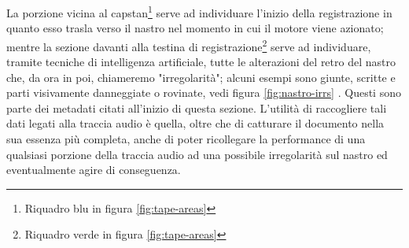 La porzione vicina al capstan\footnote{Riquadro blu in figura \ref{fig:tape-areas}} serve ad individuare l'inizio della registrazione in quanto esso trasla verso il nastro nel momento in cui il motore viene azionato; mentre la sezione davanti alla testina di registrazione\footnote{Riquadro verde in figura \ref{fig:tape-areas}} serve ad individuare, tramite tecniche di intelligenza artificiale, tutte le alterazioni del retro del nastro che, da ora in poi, chiameremo "irregolarità"; alcuni esempi sono giunte, scritte e parti visivamente danneggiate o rovinate, vedi figura \ref{fig:nastro-irrs} \cite{gravaTesiVideoAnalyser2019}.
Questi sono parte dei metadati citati all'inizio di questa sezione.
L'utilità di raccogliere tali dati legati alla traccia audio è quella, oltre che di catturare il documento nella sua essenza più completa, anche di poter ricollegare la performance di una qualsiasi porzione della traccia audio ad una possibile irregolarità sul nastro ed eventualmente agire di conseguenza.

